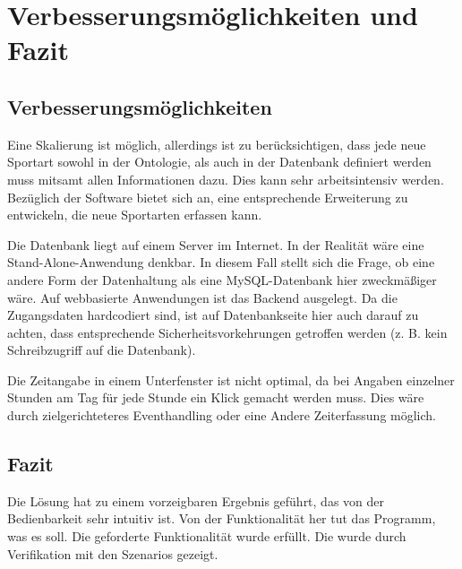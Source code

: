 \chapter{Verbesserungsmöglichkeiten und Fazit}

\section{Verbesserungsmöglichkeiten}

Eine Skalierung ist möglich, allerdings ist zu berücksichtigen, dass jede neue Sportart sowohl in der Ontologie, als auch in der Datenbank definiert werden muss mitsamt allen Informationen dazu. Dies kann sehr arbeitsintensiv werden. Bezüglich der Software bietet sich an, eine entsprechende Erweiterung zu entwickeln, die neue Sportarten erfassen kann. 

Die Datenbank liegt auf einem Server im Internet. In der Realität wäre eine Stand-Alone-Anwendung denkbar. In diesem Fall stellt sich die Frage, ob eine andere Form der Datenhaltung als eine MySQL-Datenbank hier zweckmäßiger wäre. Auf webbasierte Anwendungen ist das Backend ausgelegt. Da die Zugangsdaten hardcodiert sind, ist auf Datenbankseite hier auch darauf zu achten, dass entsprechende Sicherheitsvorkehrungen getroffen werden (z. B. kein Schreibzugriff auf die Datenbank).

Die Zeitangabe in einem Unterfenster ist nicht optimal, da bei Angaben einzelner Stunden am Tag für jede Stunde ein Klick gemacht werden muss. Dies wäre durch zielgerichteteres Eventhandling oder eine Andere Zeiterfassung möglich.

\section{Fazit}

Die Lösung hat zu einem vorzeigbaren Ergebnis geführt, das von der Bedienbarkeit sehr intuitiv ist. Von der Funktionalität her tut das Programm, was es soll. Die geforderte Funktionalität wurde erfüllt. Die wurde durch Verifikation mit den Szenarios gezeigt.
